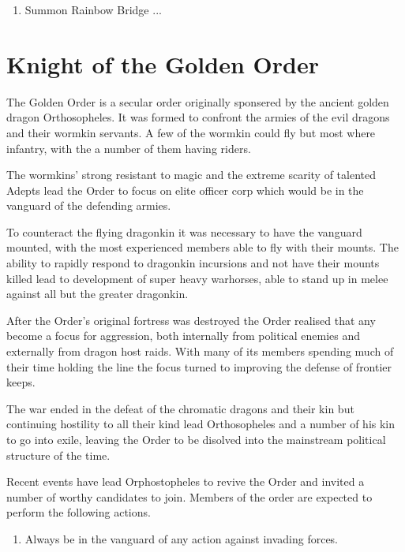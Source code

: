 \documentclass[a4paper]{article}
\begin{document}
\begin{multicols*}{3}
\begin{enumerate}
\item
\begin{ritual}{Summon Rainbow Bridge}
...
\end{ritual}
\end{enumerate}

\newpage

\section{Knight of the Golden Order}

The Golden Order is a secular order originally sponsered by the
ancient golden dragon Orthosopheles.  It was formed to confront the
armies of the evil dragons and their wormkin servants.  A few of the
wormkin could fly but most where infantry, with the a number of them
having riders.

The wormkins' strong resistant to magic and the extreme scarity of
talented Adepts lead the Order to focus on elite officer corp which
would be in the vanguard of the defending armies.

To counteract the flying dragonkin it was necessary to have the
vanguard mounted, with the most experienced members able to fly with
their mounts.  The ability to rapidly respond to dragonkin incursions
and not have their mounts killed lead to development of super heavy
warhorses, able to stand up in melee against all but the greater
dragonkin.

After the Order's original fortress was destroyed the Order realised
that any become a focus for aggression, both internally from political
enemies and externally from dragon host raids.  With many of its
members spending much of their time holding the line the focus turned
to improving the defense of frontier keeps.

The war ended in the defeat of the chromatic dragons and their kin but
continuing hostility to all their kind lead Orthosopheles and a number
of his kin to go into exile, leaving the Order to be disolved into the
mainstream political structure of the time.

Recent events have lead Orphostopheles to revive the Order and invited
a number of worthy candidates to join.  Members of the order are
expected to perform the following actions.
\begin{enumerate}
\item Always be in the vanguard of any action against invading forces.


\end{enumerate}
\end{multicols*}
\end{document}
